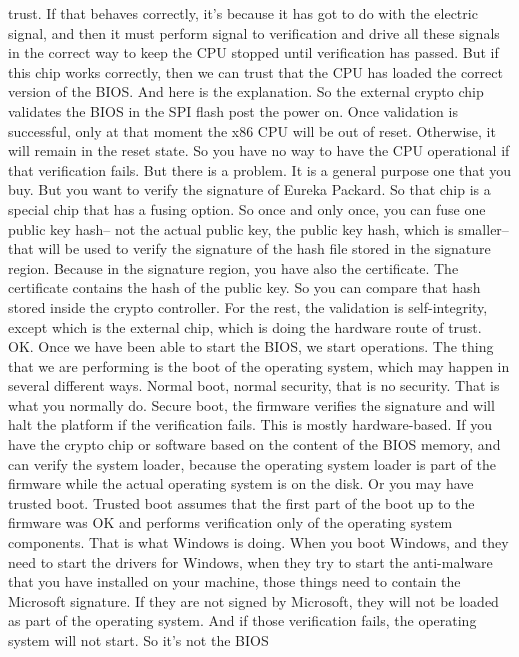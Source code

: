  trust. If that behaves correctly, it's because it has got to do with the
 electric signal, and then it must perform signal to verification and drive all
 these signals in the correct way to keep the CPU stopped until verification
 has passed. But if this chip works correctly, then we can trust that the CPU
 has loaded the correct version of the BIOS. And here is the explanation. So
 the external crypto chip validates the BIOS in the SPI flash post the power
 on. Once validation is successful, only at that moment the x86 CPU will be out
 of reset. Otherwise, it will remain in the reset state. So you have no way to
 have the CPU operational if that verification fails. But there is a problem.
 It is a general purpose one that you buy. But you want to verify the signature
 of Eureka Packard. So that chip is a special chip that has a fusing option. So
 once and only once, you can fuse one public key hash-- not the actual public
 key, the public key hash, which is smaller-- that will be used to verify the
 signature of the hash file stored in the signature region. Because in the
 signature region, you have also the certificate. The certificate contains the
 hash of the public key. So you can compare that hash stored inside the crypto
 controller. For the rest, the validation is self-integrity, except which is
 the external chip, which is doing the hardware route of trust. OK. Once we
 have been able to start the BIOS, we start operations. The thing that we are
 performing is the boot of the operating system, which may happen in several
 different ways. Normal boot, normal security, that is no security. That is
 what you normally do. Secure boot, the firmware verifies the signature and
 will halt the platform if the verification fails. This is mostly
 hardware-based. If you have the crypto chip or software based on the content
 of the BIOS memory, and can verify the system loader, because the operating
 system loader is part of the firmware while the actual operating system is on
 the disk. Or you may have trusted boot. Trusted boot assumes that the first
 part of the boot up to the firmware was OK and performs verification only of
 the operating system components. That is what Windows is doing. When you boot
 Windows, and they need to start the drivers for Windows, when they try to
 start the anti-malware that you have installed on your machine, those things
 need to contain the Microsoft signature. If they are not signed by Microsoft,
 they will not be loaded as part of the operating system. And if those
 verification fails, the operating system will not start. So it's not the BIOS
